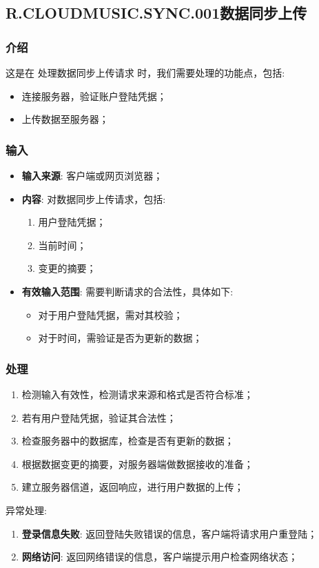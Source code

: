 \subsection{R.CLOUDMUSIC.SYNC.001数据同步上传}
\subsubsection{介绍}
	这是在 处理数据同步上传请求 时，我们需要处理的功能点，包括: 
	\begin{itemize}
		\item 连接服务器，验证账户登陆凭据；
		\item 上传数据至服务器；
	\end{itemize}
\subsubsection{输入}
	\begin{itemize}
		\item \textbf{输入来源}: 客户端或网页浏览器；
		\item \textbf{内容}: 对数据同步上传请求，包括: 
		\begin{enumerate}
			\item 用户登陆凭据；
			\item 当前时间；
			\item 变更的摘要；
		\end{enumerate}
		\item \textbf{有效输入范围}: 需要判断请求的合法性，具体如下: 
		\begin{itemize}
			\item 对于用户登陆凭据，需对其校验； 
			\item 对于时间，需验证是否为更新的数据； 
		\end{itemize}
	\end{itemize}
\subsubsection{处理}
	\begin{enumerate}
		\item 检测输入有效性，检测请求来源和格式是否符合标准；
		\item 若有用户登陆凭据，验证其合法性；
		\item 检查服务器中的数据库，检查是否有更新的数据；
		\item 根据数据变更的摘要，对服务器端做数据接收的准备；
		\item 建立服务器信道，返回响应，进行用户数据的上传；
	\end{enumerate}
	\noindent 异常处理: 
	\begin{enumerate}
		\item \textbf{登录信息失败}: 返回登陆失败错误的信息，客户端将请求用户重登陆；
		\item \textbf{网络访问}: 返回网络错误的信息，客户端提示用户检查网络状态；
	\end{enumerate}
